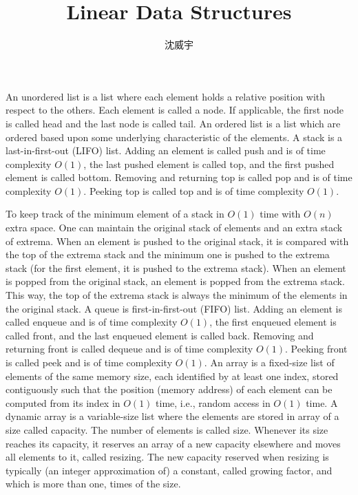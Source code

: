 \documentclass[a4paper,12pt]{article}
\begin{document}
\title{Linear Data Structures}
\author{沈威宇}
\date{\temtoday}
\titledoc
{}
An unordered list is a list where each element holds a relative position with respect to the others. Each element is called a node. If applicable, the first node is called head and the last node is called tail.
An ordered list is a list which are ordered based upon some underlying characteristic of the elements.
A stack is a last-in-first-out (LIFO) list. Adding an element is called push and is of time complexity $O(1)$, the last pushed element is called top, and the first pushed element is called bottom. Removing and returning top is called pop and is of time complexity $O(1)$. Peeking top is called top and is of time complexity $O(1)$.

To keep track of the minimum element of a stack in $O(1)$ time with $O(n)$ extra space. One can maintain the original stack of elements and an extra stack of extrema. When an element is pushed to the original stack, it is compared with the top of the extrema stack and the minimum one is pushed to the extrema stack (for the first element, it is pushed to the extrema stack). When an element is popped from the original stack, an element is popped from the extrema stack. This way, the top of the extrema stack is always the minimum of the elements in the original stack.
A queue is first-in-first-out (FIFO) list. Adding an element is called enqueue and is of time complexity $O(1)$, the first enqueued element is called front, and the last enqueued element is called back. Removing and returning front is called dequeue and is of time complexity $O(1)$. Peeking front is called peek and is of time complexity $O(1)$.
An array is a fixed-size list of elements of the same memory size, each identified by at least one index, stored contiguously such that the position (memory address) of each element can be computed from its index in $O(1)$ time, i.e., random access in $O(1)$ time.
A dynamic array is a variable-size list where the elements are stored in array of a size called capacity. The number of elements is called size. Whenever its size reaches its capacity, it reserves an array of a new capacity elsewhere and moves all elements to it, called resizing. The new capacity reserved when resizing is typically (an integer approximation of) a constant, called growing factor, and which is more than one, times of the size.
\end{document}
